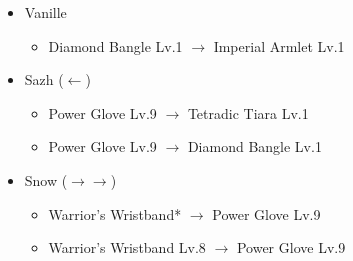 \begin{menu}
\begin{itemize}
\begin{itemize}
{  				}%
				{\paradigmline{\com}{\com}{\com}}%
				{\paradigmline{(\sen)}{\sab}{(\sen)}}%
				{\paradigmline{(\sen)}{(\med)}{(\sen)}}%
				{\paradigmline[4]{\syn}{\sab}{\com}}%
				{\paradigmline{\rav}{\med}{(\sen)}}%
				{\paradigmline{\rav}{\rav}{\rav}}%
		\end{itemize}
		\equip
		\begin{itemize}
			\item Vanille
				\begin{itemize}
					\item Diamond Bangle Lv.1 $\rightarrow$ Imperial Armlet Lv.1
				\end{itemize}
			\item Sazh ($\leftarrow$)
				\begin{itemize}
					\item Power Glove Lv.9 $\rightarrow$ Tetradic Tiara Lv.1
					\item Power Glove Lv.9 $\rightarrow$ Diamond Bangle Lv.1
				\end{itemize}
			\item Snow ($\rightarrow\rightarrow$)
				\begin{itemize}
					\item Warrior's Wristband* $\rightarrow$ Power Glove Lv.9
					\item Warrior's Wristband Lv.8 $\rightarrow$ Power Glove Lv.9
				\end{itemize}
		\end{itemize}
	\end{itemize}	
\end{menu}
	
\renewcommand{\second}{[2] Overcaution (\sen/\sab/\sen)}
\renewcommand{\third}{[3] Consolidation (\sen/\med/\sen)}
\renewcommand{\fifth}{[5] Entourage (\rav/\med/\sen)}


